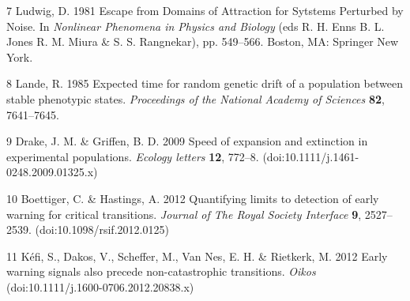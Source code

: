 \documentclass{article}
\begin{document}
7 Ludwig, D. 1981 Escape from Domains of Attraction for Sytstems
Perturbed by Noise. In \emph{Nonlinear Phenomena in Physics and Biology}
(eds R. H. Enns B. L. Jones R. M. Miura \& S. S. Rangnekar), pp.
549--566. Boston, MA: Springer New York.

8 Lande, R. 1985 Expected time for random genetic drift of a population
between stable phenotypic states. \emph{Proceedings of the National
Academy of Sciences} \textbf{82}, 7641--7645.

9 Drake, J. M. \& Griffen, B. D. 2009 Speed of expansion and extinction
in experimental populations. \emph{Ecology letters} \textbf{12}, 772--8.
(doi:10.1111/j.1461-0248.2009.01325.x)

10 Boettiger, C. \& Hastings, A. 2012 Quantifying limits to detection of
early warning for critical transitions. \emph{Journal of The Royal
Society Interface} \textbf{9}, 2527--2539. (doi:10.1098/rsif.2012.0125)

11 Kéfi, S., Dakos, V., Scheffer, M., Van Nes, E. H. \& Rietkerk, M.
2012 Early warning signals also precede non-catastrophic transitions.
\emph{Oikos} (doi:10.1111/j.1600-0706.2012.20838.x)
\end{document}
